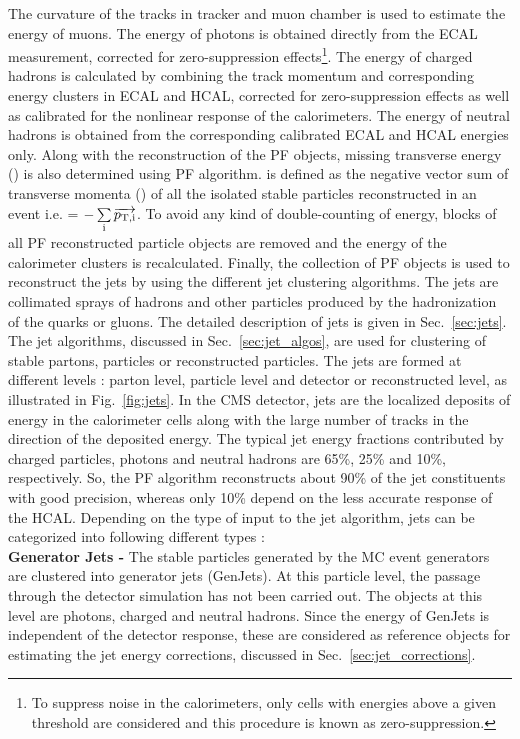 The curvature of the tracks in tracker and muon chamber is used to estimate the energy of muons. The energy of photons is obtained directly from the ECAL measurement, corrected for zero-suppression effects\footnote{To suppress noise in the calorimeters, only cells with energies above a given threshold are considered and this procedure is known as zero-suppression.}. The energy of charged hadrons is calculated by combining the track momentum and corresponding energy clusters in ECAL and HCAL, corrected for zero-suppression effects as well as calibrated for the nonlinear response of the calorimeters. The energy of neutral hadrons is obtained from the corresponding calibrated ECAL and HCAL energies only. Along with the reconstruction of the PF objects, missing transverse energy (\ETmiss) is also determined using PF algorithm. \ETmiss is defined as the negative vector sum of transverse momenta (\pt) of all the isolated stable particles reconstructed in an event i.e. \ETmiss = $-\sum\limits_{\rm i}^{}\overrightarrow{p_{\rm T,i}}$. To avoid any kind of double-counting of energy, blocks of all PF reconstructed particle objects are removed and the energy of the calorimeter clusters is recalculated. Finally, the collection of PF objects is used to reconstruct the jets by using the different jet clustering algorithms. The jets are collimated sprays of hadrons and other particles produced by the hadronization of the quarks or gluons. The detailed description of jets is given in Sec.~\ref{sec:jets}. The jet algorithms, discussed in Sec.~\ref{sec:jet_algos}, are used for clustering of stable partons, particles or reconstructed particles. The jets are formed at different levels : parton level, particle level and detector or reconstructed level, as illustrated in Fig.~\ref{fig:jets}. In the CMS detector, jets are the localized deposits of energy in the calorimeter cells along with the large number of tracks in the direction of the deposited energy. The typical jet energy fractions contributed by charged particles, photons and neutral hadrons are
65\%, 25\% and 10\%, respectively. So, the PF algorithm reconstructs about 90\% of the jet constituents with good precision, whereas only 10\% depend on the less accurate response of the HCAL. Depending on the type of input to the jet algorithm, jets can be categorized into following different types :\\ \newline 
{\bf Generator Jets -} The stable particles generated by the MC event generators are clustered into generator jets (GenJets). At this particle level, the passage through the detector simulation has not been carried out. The objects at this level are photons, charged and neutral hadrons. Since the energy of GenJets is independent of the detector response, these are considered as reference objects for estimating the jet energy corrections, discussed in Sec.~\ref{sec:jet_corrections}. \\ \newline
